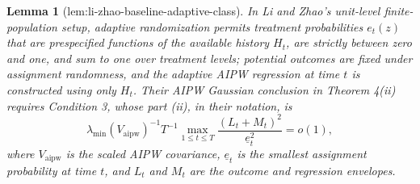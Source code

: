 \documentclass{article}
\newtheorem{lemma}{Lemma}
\begin{document}
\begin{lemma}[lem:li-zhao-baseline-adaptive-class]\label{lem:li-zhao-baseline-adaptive-class}
In Li and Zhao's unit-level finite-population setup, adaptive randomization permits treatment probabilities \(e_t(z)\) that are prespecified functions of the available history \(H_t\), are strictly between zero and one, and sum to one over treatment levels; potential outcomes are fixed under assignment randomness, and the adaptive AIPW regression at time \(t\) is constructed using only \(H_t\). Their AIPW Gaussian conclusion in Theorem 4(ii) requires Condition 3, whose part (ii), in their notation, is
\[
 \lambda_{\min}(V_{\mathrm{aipw}})^{-1}T^{-1}
 \max_{1\le t\le T}\frac{(L_t+M_t)^2}{\underline e_t^2}=o(1),
\]
where \(V_{\mathrm{aipw}}\) is the scaled AIPW covariance, \(\underline e_t\) is the smallest assignment probability at time \(t\), and \(L_t\) and \(M_t\) are the outcome and regression envelopes.
\end{lemma}
\end{document}
